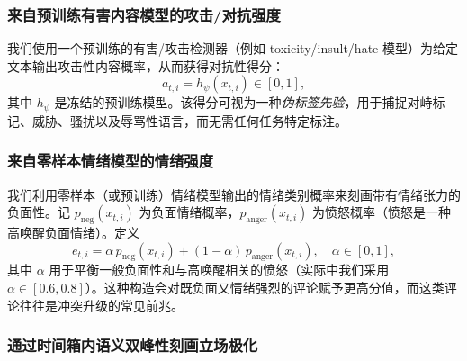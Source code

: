 \documentclass[conference]{IEEEtran}
\begin{document}
\subsubsection{来自预训练有害内容模型的攻击/对抗强度}

我们使用一个预训练的有害/攻击检测器（例如 toxicity/insult/hate 模型）为给定文本输出攻击性内容概率，从而获得对抗性得分：
\begin{equation}
a_{t,i} = h_{\psi}(x_{t,i}) \in [0,1],
\label{eq:attack_score}
\end{equation}
其中 $h_{\psi}$ 是冻结的预训练模型。该得分可视为一种\emph{伪标签先验}，用于捕捉对峙标记、威胁、骚扰以及辱骂性语言，而无需任何任务特定标注。

\subsubsection{来自零样本情绪模型的情绪强度}

我们利用零样本（或预训练）情绪模型输出的情绪类别概率来刻画带有情绪张力的负面性。记 $p_{\text{neg}}(x_{t,i})$ 为负面情绪概率，$p_{\text{anger}}(x_{t,i})$ 为愤怒概率（愤怒是一种高唤醒负面情绪）。定义
\begin{equation}
e_{t,i} = \alpha\, p_{\text{neg}}(x_{t,i}) + (1-\alpha)\, p_{\text{anger}}(x_{t,i}), \quad \alpha \in [0,1],
\label{eq:emotion_score}
\end{equation}
其中 $\alpha$ 用于平衡一般负面性和与高唤醒相关的愤怒（实际中我们采用 $\alpha\in[0.6,0.8]$）。这种构造会对既负面又情绪强烈的评论赋予更高分值，而这类评论往往是冲突升级的常见前兆。

\subsubsection{通过时间箱内语义双峰性刻画立场极化}
\end{document}
